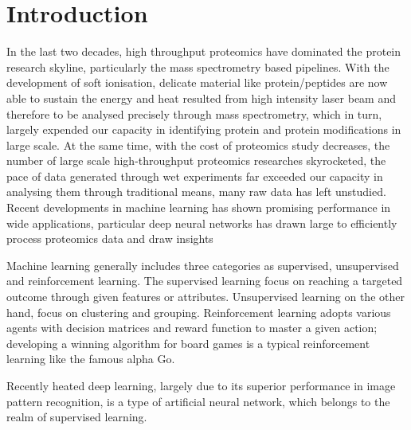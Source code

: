 \section{Introduction}

In the last two decades, high throughput proteomics have dominated the protein research skyline, particularly the mass spectrometry based pipelines. With the development of soft ionisation, delicate material like protein/peptides are now able to sustain the energy and heat resulted from high intensity laser beam and therefore to be analysed precisely through mass spectrometry, which in turn, largely expended our capacity in identifying protein and protein modifications in large scale. At the same time, with the cost of proteomics study decreases, the number of large scale high-throughput proteomics researches skyrocketed, the pace of data generated through wet experiments far exceeded our capacity in analysing them through traditional means, many raw data has left unstudied. Recent developments in machine learning has shown promising performance in wide applications, particular deep neural networks has drawn large to efficiently process proteomics data and draw insights 
\par 
Machine learning generally includes three categories as supervised, unsupervised and reinforcement learning. The supervised learning focus on reaching a targeted outcome through given features or attributes. Unsupervised learning on the other hand, focus on clustering and grouping. Reinforcement learning adopts various agents with decision matrices and reward function to master a given action; developing a winning algorithm for board games is a typical reinforcement learning like the famous alpha Go.
\par
Recently heated deep learning, largely due to its superior performance in image pattern recognition, is a type of artificial neural network, which belongs to the realm of supervised learning. 
